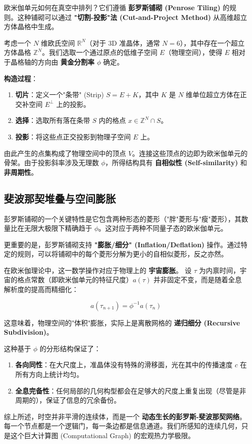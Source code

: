 欧米伽单元如何在真空中排列？它们遵循 \textbf{彭罗斯铺砌 (Penrose Tiling)} 的规则。这种铺砌可以通过 \textbf{"切割-投影"法 (Cut-and-Project Method)} 从高维超立方体晶格中生成。

考虑一个 $N$ 维欧氏空间 $\mathbb{R}^N$（对于 3D 准晶体，通常 $N=6$），其中存在一个超立方体晶格 $\mathbb{Z}^N$。我们选取一个通过原点的低维子空间 $E$（物理空间），使得 $E$ 相对于晶格轴的方向由 \textbf{黄金分割率 $\phi$} 确定。

\textbf{构造过程}：

\begin{enumerate}
\item \textbf{切片}：定义一个"条带" (Strip) $S = E + K$，其中 $K$ 是 $N$ 维单位超立方体在正交补空间 $E^\perp$ 上的投影。
\item \textbf{选择}：选取所有落在条带 $S$ 内的格点 $x \in \mathbb{Z}^N \cap S$。
\item \textbf{投影}：将这些点正交投影到物理子空间 $E$ 上。
\end{enumerate}

由此产生的点集构成了物理空间中的顶点 $V$。连接这些顶点的边即为欧米伽单元的骨架。由于投影斜率涉及无理数 $\phi$，所得结构具有 \textbf{自相似性 (Self-similarity)} 和 \textbf{非周期性}。

\subsection{斐波那契堆叠与空间膨胀}

彭罗斯铺砌的一个关键特性是它包含两种形态的菱形（"胖"菱形与"瘦"菱形），其数量比在无限大极限下精确趋于 $\phi$。这对应于两种不同量子态的欧米伽单元。

更重要的是，彭罗斯铺砌支持 \textbf{"膨胀/细分" (Inflation/Deflation)} 操作。通过特定的规则，可以将铺砌中的每个菱形分解为更小的自相似菱形，反之亦然。

在欧米伽理论中，这一数学操作对应于物理上的 \textbf{宇宙膨胀}。
设 $\tau$ 为内禀时间，宇宙的格点常数（即欧米伽单元的特征尺度）$a(\tau)$ 并非固定不变，而是随着全息解析度的提高而精细化：

\[a(\tau_{n+1}) = \phi^{-1} a(\tau_n)\]

这意味着，物理空间的"体积"膨胀，实际上是离散网格的 \textbf{递归细分 (Recursive Subdivision)}。

这种基于 $\phi$ 的分形结构保证了：

\begin{enumerate}
\item \textbf{各向同性}：在大尺度上，准晶体没有特殊的滑移面，光在其中的传播速度 $c$ 在所有方向上统计均匀。
\item \textbf{全息完备性}：任何局部的几何构型都会在足够大的尺度上重复出现（尽管是非周期的），保证了信息的冗余备份。
\end{enumerate}

综上所述，时空并非平滑的连续体，而是一个 \textbf{动态生长的彭罗斯-斐波那契网络}。每一个节点都是一个逻辑门，每一条边都是信息通道。我们所感知的连续几何，只是这个巨大计算图 (Computational Graph) 的宏观热力学极限。
